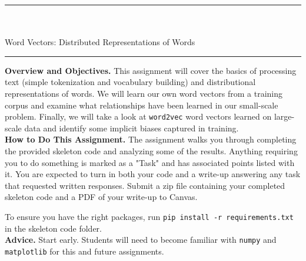 \documentclass[a4paper,10pt]{article}
\begin{document}
\sffamily

\begin{center}
\noindent\rule{\textwidth}{1pt}\\[10pt]
{\color{blue!60}{AI539 Natural Language Processing with Deep Learning -- Homework 1}}\\[10pt]
{\LARGE Word Vectors: Distributed Representations of Words}\\[10pt]
\noindent\rule{\textwidth}{1pt}
\end{center}

\noindent\textbf{Overview and Objectives.} This assignment will cover the basics of processing text (simple tokenization and vocabulary building) and distributional representations of words. We will learn our own word vectors from a training corpus and examine what relationships have been learned in our small-scale problem. Finally, we will take a look at \texttt{word2vec} \cite{mikolov2013efficient} word vectors learned on large-scale data and identify some implicit biases captured in training.\\

\noindent\textbf{How to Do This Assignment.} The assignment walks you through completing the provided skeleton code and analyzing some of the results. Anything requiring you to do something is marked as a "Task" and has associated points listed with it. You are expected to turn in both your code and a write-up answering any task that requested written responses. Submit a zip file containing your completed skeleton code and a PDF of your write-up to Canvas. 

To ensure you have the right packages, run \texttt{pip install -r requirements.txt} in the skeleton code folder.\\

\noindent\textbf{Advice.} Start early. Students will need to become familiar with \texttt{numpy} and \texttt{matplotlib} for this and future assignments. 
\end{document}
